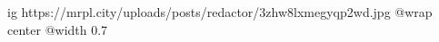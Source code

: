  
 
 
 
 

\ifcmt
  ig https://mrpl.city/uploads/posts/redactor/3zhw8lxmegyqp2wd.jpg
  @wrap center
  @width 0.7
\fi

